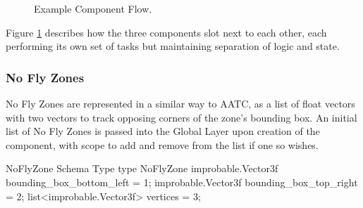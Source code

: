 \documentclass[a4paper,12pt,titlepage]{article}
\begin{document}
\begin{figure}[!hbpt]
 \centering
 \caption{Example Component Flow.}
 \label{fig:controller_global_bitmap_flow}
 \end{figure}

 Figure \ref{fig:controller_global_bitmap_flow} describes how the three components slot next to each other, each performing its own set of tasks but maintaining separation of logic and state.

\subsubsection{No Fly Zones}
No Fly Zones are represented in a similar way to AATC, as a list of float vectors with two vectors to track opposing corners of the zone's bounding box. An initial list of No Fly Zones is passed into the Global Layer upon creation of the component, with scope to add and remove from the list if one so wishes.\\
\begin{sexylisting}[colback=white]{NoFlyZone Schema Type}
type NoFlyZone {
  improbable.Vector3f bounding_box_bottom_left = 1;
  improbable.Vector3f bounding_box_top_right = 2;
  list<improbable.Vector3f> vertices = 3;
}
\end{sexylisting}
\end{document}
